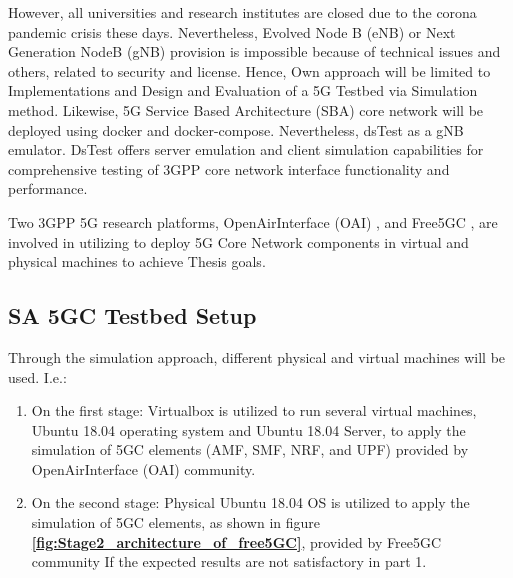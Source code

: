  However, all universities and research institutes are closed due to the corona pandemic crisis these days. Nevertheless, Evolved Node B (eNB) or Next Generation NodeB (gNB) provision is impossible because of technical issues and others, related to security and license. Hence, Own approach will be limited to Implementations and Design and Evaluation of a 5G Testbed via Simulation method. Likewise, 5G Service Based Architecture  (SBA) core network will be deployed using docker and docker-compose. Nevertheless, dsTest as a gNB emulator. DsTest offers server emulation and client simulation capabilities for comprehensive testing of 3GPP core network interface functionality and performance\cite{dstest2021}.
 
 

 
 
Two 3GPP 5G research platforms, OpenAirInterface (OAI)  \cite{openairinterface2014}, and Free5GC \cite{Free5gc2019}, are involved in utilizing to deploy 5G Core Network components in virtual and physical machines to achieve Thesis goals.



\subsection{SA 5GC Testbed Setup}

Through the simulation approach, different physical and virtual machines will be used. I.e.:
\begin{enumerate}
    \item  On the first stage: Virtualbox is utilized to run several virtual machines, Ubuntu 18.04 operating system and Ubuntu 18.04 Server, to apply the simulation of 5GC  elements (AMF, SMF, NRF, and UPF) provided by OpenAirInterface (OAI) community.
    \item On the second stage: Physical Ubuntu 18.04 OS is utilized to apply the simulation of 5GC  elements, as shown in figure
    \textbf{\ref{fig:Stage2_architecture_of_free5GC}}, provided by Free5GC community If the expected results are not satisfactory in part 1.
    \end{enumerate}
    
